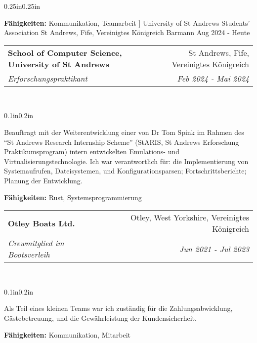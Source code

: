 \documentclass[a4paper]{article}
\makeatletter
\newcommand{\resumeSubheading}[5][]{
  \vspace{2pt}\item
    \begin{tabular*}{0.875\textwidth}[t]{l@{\extracolsep{\fill}}r}
      \textbf{#2} & #3 \\
      \textit{\small#4} & \textit{\small #5} \\
    \end{tabular*}\\
    \vspace{-5pt}
    \begin{adjustwidth}{0.1in}{0.2in}
      #1
    \end{adjustwidth}
    \vspace{10pt}
}
\makeatother
\begin{document}
\begin{adjustwidth}{0.25in}{0.25in}
{        \textbf{Fähigkeiten:} {Kommunikation, Teamarbeit}
      ]
        {University of St Andrews Students' Association}
        {St Andrews, Fife, Vereinigtes Königreich}
        {Barmann}
        {Aug 2024 {-} Heute}
      \resumeSubheading[
        Beauftragt mit der Weiterentwicklung einer von Dr Tom Spink im Rahmen
        des ``St Andrews Research Internship Scheme'' (StARIS, St Andrews
        Erforschung Praktikumsprogram) intern entwickelten Emulations- und
        Virtualisierungstechnologie. Ich war verantwortlich für: die
        Implementierung von Systemaufrufen, Dateisystemen, und
        Konfigurationsparsen; Fortschrittsberichte; Planung der Entwicklung.

        \textbf{Fähigkeiten:} {Rust, Systemsprogrammierung}
      ]
        {School of Computer Science, University of St Andrews}
        {St Andrews, Fife, Vereinigtes Königreich}
        {Erforschungspraktikant}
        {Feb 2024 {-} Mai 2024}
      \resumeSubheading[
        Als Teil eines kleinen Teams war ich zuständig für die
        Zahlungsabwicklung, Gästebetreuung, und die Gewährleistung der
        Kundensicherheit.

        \textbf{Fähigkeiten:} {Kommunikation, Mitarbeit}
      ]
        {Otley Boats Ltd.}
        {Otley, West Yorkshire, Vereinigtes Königreich}
        {Crewmitglied im Bootsverleih}
        {Jun 2021 {-} Jul 2023}
    }

  \newpage{}


\end{adjustwidth}
\end{document}
